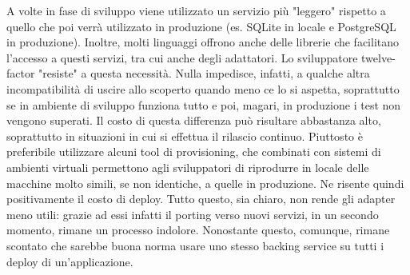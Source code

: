 \documentclass[PianoDiQualifica.tex]{subfiles}
\begin{document}
A volte in fase di sviluppo viene utilizzato un servizio più "leggero" rispetto a quello che poi verrà utilizzato in produzione (es. SQLite in locale e PostgreSQL in produzione). Inoltre, molti linguaggi offrono anche delle librerie che facilitano l'accesso a questi servizi, tra cui anche degli adattatori. Lo sviluppatore twelve-factor "resiste" a questa necessità. Nulla impedisce, infatti, a qualche altra incompatibilità di uscire allo scoperto quando meno ce lo si aspetta, soprattutto se in ambiente di sviluppo funziona tutto e poi, magari, in produzione i test non vengono superati. Il costo di questa differenza può risultare abbastanza alto, soprattutto in situazioni in cui si effettua il rilascio continuo.
Piuttosto è preferibile utilizzare alcuni tool di provisioning, che combinati con sistemi di ambienti virtuali permettono agli sviluppatori di riprodurre in locale delle macchine molto simili, se non identiche, a quelle in produzione. Ne risente quindi positivamente il costo di deploy.
Tutto questo, sia chiaro, non rende gli adapter meno utili: grazie ad essi infatti il porting verso nuovi servizi, in un secondo momento, rimane un processo indolore. Nonostante questo, comunque, rimane scontato che sarebbe buona norma usare uno stesso backing service su tutti i deploy di un'applicazione.
\end{document}
